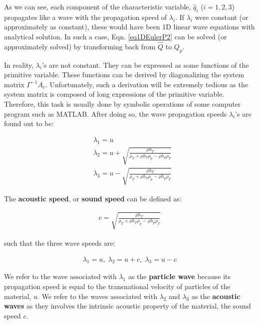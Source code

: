 \documentclass[12pt, letterpaper]{report}
\begin{document}
As we can see, each component of the characteristic variable, $\widehat{q}_i$ ($i=1,2,3$) propagates
like a wave with the propagation speed of $\lambda_i$. If $\lambda_i$ were constant (or
approximately as constant), these would have been 1D linear wave equations with analytical solution.
In such a case, Eqn. \ref{eq1DEulerP2} can be solved (or approximately solved) by transforming back
from $\widehat{Q}$ to $Q_p$.\paraspace

In reality, $\lambda_i$'s are not constant. They can be expressed as some functions of the primitive
variable. These functions can be derived by diagonalizing the system matrix $\Gamma^{-1}A_c$.
Unfortunately, such a derivation will be extremely tedious as the system matrix is composed of long
expressions of the primitive variable. Therefore, this task is usually done by symbolic
operations of some computer program such as MATLAB. After doing so, the wave propagation speeds
$\lambda_i$'s are found out to be:

\begin{subequations}\label{eqwavespeed}
   \begin{align}
      &\lambda_1 = u \\
      &\lambda_2 = u + \sqrt{\frac{\rho h_T}{\rho_T + \rho h_T \rho_p - \rho h_p \rho_T}} \\
      &\lambda_3 = u - \sqrt{\frac{\rho h_T}{\rho_T + \rho h_T \rho_p - \rho h_p \rho_T}}
   \end{align}
\end{subequations}

The {\bf acoustic speed}, or {\bf sound speed} can be defined as:

\begin{align}\label{eqsoundspeed}
   c = \sqrt{\frac{\rho h_T}{\rho_T + \rho h_T \rho_p - \rho h_p \rho_T}}
\end{align}

such that the three wave speeds are:

\begin{align*}
   \lambda_1 = u, \; \lambda_2 = u+c, \; \lambda_3 = u-c
\end{align*}

We refer to the wave associated with $\lambda_1$ as the {\bf particle wave} because its propagation
speed is equal to the transnational velocity of particles of the material, $u$. We refer to the
waves associated with $\lambda_2$ and $\lambda_3$ as the {\bf acoustic waves} as they involves the
intrinsic acoustic property of the material, the sound speed $c$. \paraspace
\end{document}
